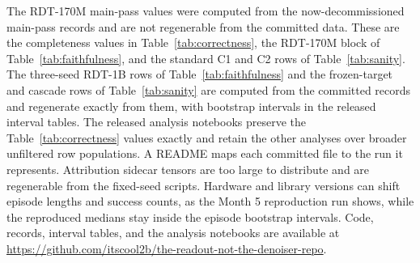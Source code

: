 \documentclass{article}
\begin{document}
The RDT-170M main-pass values were computed from the now-decommissioned main-pass records and are not regenerable from the committed data.
These are the completeness values in Table~\ref{tab:correctness}, the RDT-170M block of Table~\ref{tab:faithfulness}, and the standard C1 and C2 rows of Table~\ref{tab:sanity}.
The three-seed RDT-1B rows of Table~\ref{tab:faithfulness} and the frozen-target and cascade rows of Table~\ref{tab:sanity} are computed from the committed records and regenerate exactly from them, with bootstrap intervals in the released interval tables.
The released analysis notebooks preserve the Table~\ref{tab:correctness} values exactly and retain the other analyses over broader unfiltered row populations.
A README maps each committed file to the run it represents.
Attribution sidecar tensors are too large to distribute and are regenerable from the fixed-seed scripts.
Hardware and library versions can shift episode lengths and success counts, as the Month 5 reproduction run shows, while the reproduced medians stay inside the episode bootstrap intervals.
Code, records, interval tables, and the analysis notebooks are available at \url{https://github.com/itscool2b/the-readout-not-the-denoiser-repo}.



\end{document}
